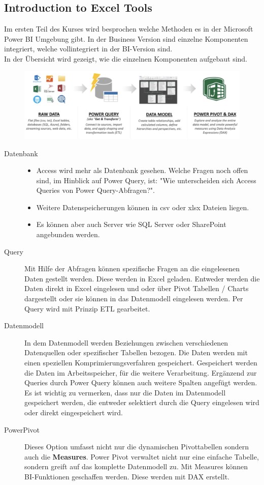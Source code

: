 \subsection{Introduction to Excel Tools}
Im ersten Teil des Kurses wird besprochen welche Methoden es in der Microsoft Power BI Umgebung gibt. In der Business Version sind einzelne Komponenten integriert, welche vollintegriert in der BI-Version sind. \\ 
In der Übersicht wird gezeigt, wie die einzelnen Komponenten aufgebaut sind.
\begin{figure}[H]
	\centering
	\includegraphics[scale = 0.3]{attachment/chapter_1/screenshot019}
	\caption{}
	\label{fig:screenshot019}
\end{figure}
\begin{description} 
\item[Datenbank] 
\begin{itemize}
\item Access wird mehr als Datenbank gesehen. Welche Fragen noch offen sind, im Hinblick auf Power Query, ist: "Wie unterscheiden sich Access Queries von Power Query-Abfragen?". 
\item Weitere Datenspeicherungen können in \gls{csv} oder \gls{xlsx} Dateien liegen.
\item Es können aber auch Server wie SQL Server oder SharePoint angebunden werden.
\end{itemize}
\item[Query] Mit Hilfe der Abfragen können spezifische Fragen an die eingelesenen Daten gestellt werden. Diese werden in Excel geladen. Entweder werden die Daten direkt in Excel eingelesen und oder über Pivot Tabellen / Charts dargestellt oder sie können in das Datenmodell eingelesen werden. Per Query wird mit Prinzip \gls{ETL} gearbeitet. 
\item[Datenmodell] In dem Datenmodell werden Beziehungen zwischen verschiedenen Datenquellen oder spezifischer Tabellen bezogen. Die Daten werden mit einen speziellen Komprimierungsverfahren gespeichert. Gespeichert werden die Daten im Arbeitsspeicher, für die weitere Verarbeitung. Ergänzend zur Queries durch Power Query können auch weitere Spalten angefügt werden. Es ist wichtig zu vermerken, dass nur die Daten im Datenmodell gespeichert werden, die entweder selektiert durch die Query eingelesen wird oder direkt eingespeichert wird. 
\item[PowerPivot] Dieses Option umfasst nicht nur die dynamischen Pivottabellen sondern auch die \textbf{Measures}. Power Pivot verwaltet nicht nur eine einfache Tabelle, sondern greift auf das komplette Datenmodell zu. Mit Measures können BI-Funktionen geschaffen werden. Diese werden mit \gls{DAX} erstellt.
\end{description}

